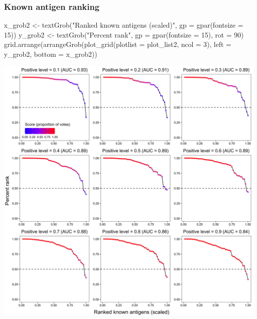 \documentclass[
  11pt,
  oneside]{book}
\newenvironment{Shaded}{\begin{snugshade}}{\end{snugshade}}
\newcommand{\AttributeTok}[1]{\textcolor[rgb]{0.77,0.63,0.00}{#1}}
\newcommand{\DecValTok}[1]{\textcolor[rgb]{0.00,0.00,0.81}{#1}}
\newcommand{\FunctionTok}[1]{\textcolor[rgb]{0.00,0.00,0.00}{#1}}
\newcommand{\NormalTok}[1]{#1}
\newcommand{\OtherTok}[1]{\textcolor[rgb]{0.56,0.35,0.01}{#1}}
\newcommand{\StringTok}[1]{\textcolor[rgb]{0.31,0.60,0.02}{#1}}
\begin{document}
\hypertarget{known-antigen-ranking-1}{%
\subsubsection{Known antigen ranking}\label{known-antigen-ranking-1}}

\begin{Shaded}
\begin{Highlighting}[]
\NormalTok{x\_grob2 }\OtherTok{\textless{}{-}} \FunctionTok{textGrob}\NormalTok{(}\StringTok{"Ranked known antigens (scaled)"}\NormalTok{, }\AttributeTok{gp =} \FunctionTok{gpar}\NormalTok{(}\AttributeTok{fontsize =} \DecValTok{15}\NormalTok{))}
\NormalTok{y\_grob2 }\OtherTok{\textless{}{-}} \FunctionTok{textGrob}\NormalTok{(}\StringTok{"Percent rank"}\NormalTok{, }\AttributeTok{gp =} \FunctionTok{gpar}\NormalTok{(}\AttributeTok{fontsize =} \DecValTok{15}\NormalTok{), }\AttributeTok{rot =} \DecValTok{90}\NormalTok{)}
\FunctionTok{grid.arrange}\NormalTok{(}\FunctionTok{arrangeGrob}\NormalTok{(}\FunctionTok{plot\_grid}\NormalTok{(}\AttributeTok{plotlist =}\NormalTok{ plot\_list2, }\AttributeTok{ncol =} \DecValTok{3}\NormalTok{), }\AttributeTok{left =}\NormalTok{ y\_grob2, }\AttributeTok{bottom =}\NormalTok{ x\_grob2))}
\end{Highlighting}
\end{Shaded}

\begin{center}\includegraphics[width=1\linewidth]{./figures/Supplementary Fig 6} \end{center}
\end{document}
